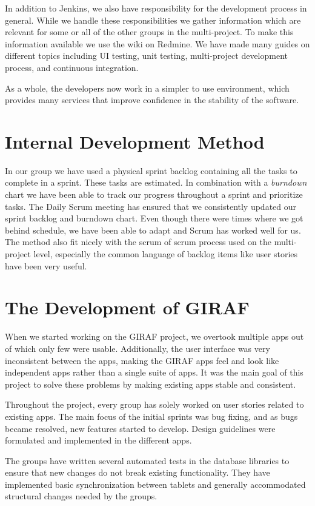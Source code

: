 In addition to Jenkins, we also have responsibility for the development process in general. While we handle these responsibilities we gather information which are relevant for some or all of the other groups in the multi-project. To make this information available we use the wiki on Redmine. We have made many guides on different topics including UI testing, unit testing, multi-project development process, and continuous integration.

As a whole, the developers now work in a simpler to use environment, which provides many services that improve confidence in the stability of the software.

\section{Internal Development Method}\label{conc:internalprocess}
In our group we have used a physical sprint backlog containing all the tasks to complete in a sprint. These tasks are estimated. In combination with a \emph{burndown} chart we have been able to track our progress throughout a sprint and prioritize tasks. The Daily Scrum meeting has ensured that we consistently updated our sprint backlog and burndown chart. Even though there were times where we got behind schedule, we have been able to adapt and Scrum has worked well for us. The method also fit nicely with the scrum of scrum process used on the multi-project level, especially the common language of backlog items like user stories have been very useful.

\section{The Development of GIRAF}\label{conc:multi_project_eval}
When we started working on the GIRAF project, we overtook multiple apps out of which only few were usable. Additionally, the user interface was very inconsistent between the apps, making the GIRAF apps feel and look like independent apps rather than a single suite of apps. It was the main goal of this project to solve these problems by making existing apps stable and consistent.

Throughout the project, every \gui{} group has solely worked on user stories related to existing apps. The main focus of the initial sprints was bug fixing, and as bugs became resolved, new features started to develop. Design guidelines were formulated and implemented in the different apps.

The \db{} groups have written several automated tests in the database libraries to ensure that new changes do not break existing functionality. They have implemented basic synchronization between tablets and generally accommodated structural changes needed by the \gui{} groups.

